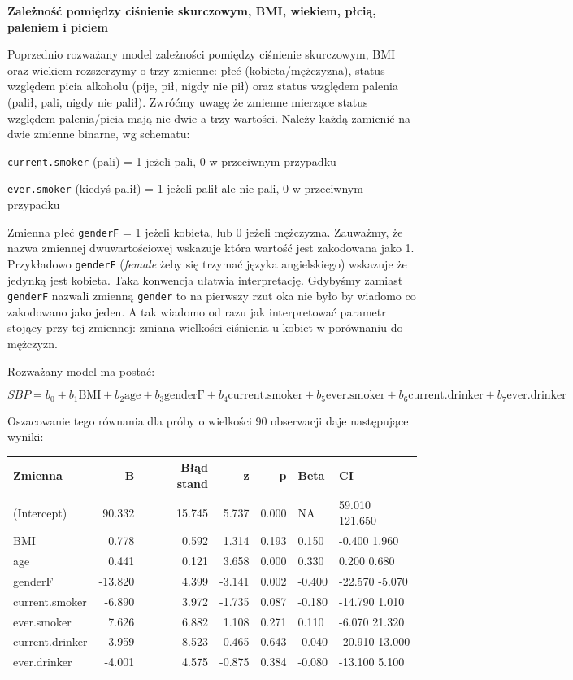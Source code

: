 \documentclass[
  openany]{book}
\begin{document}
\begin{example}
\textbf{Zależność pomiędzy ciśnienie skurczowym, BMI, wiekiem, płcią, paleniem i piciem}

Poprzednio rozważany model zależności pomiędzy ciśnienie skurczowym, BMI oraz wiekiem
rozszerzymy o trzy zmienne: płeć (kobieta/mężczyzna),
status względem picia alkoholu (pije, pił, nigdy nie pił)
oraz status względem palenia (palił, pali, nigdy nie palił).
Zwróćmy uwagę że zmienne mierzące status względem palenia/picia mają nie dwie a trzy wartości.
Należy każdą zamienić na dwie zmienne binarne, wg schematu:

\texttt{current.smoker} (pali) = 1 jeżeli pali, 0 w przeciwnym przypadku

\texttt{ever.smoker} (kiedyś palił) = 1 jeżeli palił ale nie pali, 0 w przeciwnym przypadku

Zmienna płeć \texttt{genderF} = 1 jeżeli kobieta, lub 0 jeżeli mężczyzna. Zauważmy, że nazwa zmiennej
dwuwartościowej wskazuje która wartość jest zakodowana jako 1. Przykładowo \texttt{genderF} (\emph{female} żeby się
trzymać języka angielskiego) wskazuje że jedynką jest kobieta.
Taka konwencja ułatwia interpretację. Gdybyśmy zamiast \texttt{genderF} nazwali zmienną \texttt{gender} to na pierwszy
rzut oka nie było by wiadomo co zakodowano jako jeden. A tak wiadomo od razu jak
interpretować parametr stojący przy tej zmiennej: zmiana wielkości ciśnienia u kobiet w porównaniu do mężczyzn.

Rozważany model ma postać:

\[SBP = b_0 + b_1 \textrm{BMI} + b_2 \textrm{age} + b_3 \textrm{genderF} + 
b_4 \textrm{current.smoker} + b_5 \textrm{ever.smoker} + 
b_6 \textrm{current.drinker} + b_7 \textrm{ever.drinker}\]

Oszacowanie tego równania dla próby o wielkości 90 obserwacji daje następujące wyniki:

\begin{tabular}{l|r|r|r|r|l|l}
\hline
Zmienna & B & Błąd stand & z & p & Beta & CI\\
\hline
(Intercept) & 90.332 & 15.745 & 5.737 & 0.000 & NA & 59.010 121.650\\
\hline
BMI & 0.778 & 0.592 & 1.314 & 0.193 & 0.150 & -0.400 1.960\\
\hline
age & 0.441 & 0.121 & 3.658 & 0.000 & 0.330 & 0.200 0.680\\
\hline
genderF & -13.820 & 4.399 & -3.141 & 0.002 & -0.400 & -22.570 -5.070\\
\hline
current.smoker & -6.890 & 3.972 & -1.735 & 0.087 & -0.180 & -14.790 1.010\\
\hline
ever.smoker & 7.626 & 6.882 & 1.108 & 0.271 & 0.110 & -6.070 21.320\\
\hline
current.drinker & -3.959 & 8.523 & -0.465 & 0.643 & -0.040 & -20.910 13.000\\
\hline
ever.drinker & -4.001 & 4.575 & -0.875 & 0.384 & -0.080 & -13.100 5.100\\
\hline
\end{tabular}


\end{example}
\end{document}
